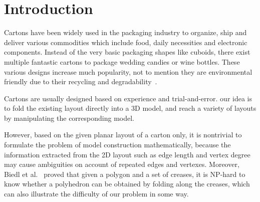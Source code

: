 \section{Introduction}

Cartons have been widely used in the packaging industry to organize, ship and deliver various commodities which include food, daily necessities and electronic components. Instead of the very basic packaging shapes like cuboids, there exist multiple fantastic cartons to package wedding candies or wine bottles. 
These various designs increase much popularity, not to mention they are environmental friendly due to their recycling and degradability~\cite{Mullineux:2010:CSC:1739328.1739673}.

Cartons are usually designed based on experience and trial-and-error.
 our idea is to fold the existing layout directly into a 3D model, and reach a variety of layouts by manipulating the corresponding model.

However, based on the given planar layout of a carton only, it is nontrivial to formulate the problem of model construction mathematically, because the information extracted from the 2D layout such as edge length and vertex degree may cause ambiguities on account of repeated edges and vertexes. Moreover, Biedl et al.~\cite{Biedl:2005:NFP:1090462.1646553} proved that given a polygon and a set of creases, it is NP-hard to know whether a polyhedron can be obtained by folding along the creases, which can also illustrate the difficulty of our problem in some way.

